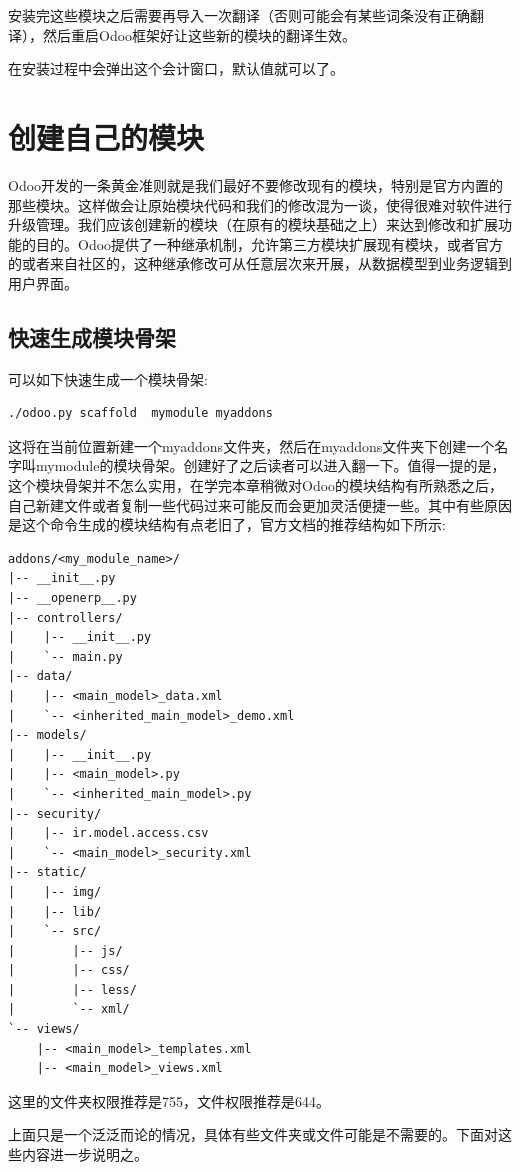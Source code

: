 \documentclass[11pt,a4paper]{sphinxmanual}
\begin{document}
安装完这些模块之后需要再导入一次翻译（否则可能会有某些词条没有正确翻译），然后重启Odoo框架好让这些新的模块的翻译生效。

在安装过程中会弹出这个会计窗口，默认值就可以了。


\chapter{创建自己的模块}
\label{sec-5}
Odoo开发的一条黄金准则就是我们最好不要修改现有的模块，特别是官方内置的那些模块。这样做会让原始模块代码和我们的修改混为一谈，使得很难对软件进行升级管理。我们应该创建新的模块（在原有的模块基础之上）来达到修改和扩展功能的目的。Odoo提供了一种继承机制，允许第三方模块扩展现有模块，或者官方的或者来自社区的，这种继承修改可从任意层次来开展，从数据模型到业务逻辑到用户界面。


\section{快速生成模块骨架}
\label{sec-5-1}
可以如下快速生成一个模块骨架:
\begin{Verbatim}
./odoo.py scaffold  mymodule myaddons
\end{Verbatim}

这将在当前位置新建一个myaddons文件夹，然后在myaddons文件夹下创建一个名字叫mymodule的模块骨架。创建好了之后读者可以进入翻一下。值得一提的是，这个模块骨架并不怎么实用，在学完本章稍微对Odoo的模块结构有所熟悉之后，自己新建文件或者复制一些代码过来可能反而会更加灵活便捷一些。其中有些原因是这个命令生成的模块结构有点老旧了，官方文档的推荐结构如下所示: 

\begin{Verbatim}
addons/<my_module_name>/
|-- __init__.py
|-- __openerp__.py
|-- controllers/
|    |-- __init__.py
|    `-- main.py
|-- data/
|    |-- <main_model>_data.xml
|    `-- <inherited_main_model>_demo.xml
|-- models/
|    |-- __init__.py
|    |-- <main_model>.py
|    `-- <inherited_main_model>.py
|-- security/
|    |-- ir.model.access.csv
|    `-- <main_model>_security.xml
|-- static/
|    |-- img/
|    |-- lib/
|    `-- src/
|        |-- js/
|        |-- css/
|        |-- less/
|        `-- xml/
`-- views/
    |-- <main_model>_templates.xml
    |-- <main_model>_views.xml
\end{Verbatim}

这里的文件夹权限推荐是755，文件权限推荐是644。


上面只是一个泛泛而论的情况，具体有些文件夹或文件可能是不需要的。下面对这些内容进一步说明之。
\end{document}
